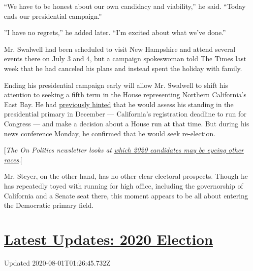 ``We have to be honest about our own candidacy and viability,'' he said.
``Today ends our presidential campaign.''

''I have no regrets,'' he added later. ``I'm excited about what we've
done.''

Mr. Swalwell had been scheduled to visit New Hampshire and attend
several events there on July 3 and 4, but a campaign spokeswoman told
The Times last week that he had canceled his plans and instead spent the
holiday with family.

Ending his presidential campaign early will allow Mr. Swalwell to shift
his attention to seeking a fifth term in the House representing Northern
California's East Bay. He had
\href{https://www.sfchronicle.com/politics/article/Eric-Swalwell-Running-for-president-if-I-m-14017678.php}{previously
hinted} that he would assess his standing in the presidential primary in
December --- California's registration deadline to run for Congress ---
and make a decision about a House run at that time. But during his news
conference Monday, he confirmed that he would seek re-election.

{[}\emph{The On Politics newsletter looks at}
\href{https://www.nytimes.com/2019/07/08/us/politics/on-politics-eric-swalwell.html}{\emph{which
2020 candidates may be eyeing other races}}\emph{.}{]}

Mr. Steyer, on the other hand, has no other clear electoral prospects.
Though he has repeatedly toyed with running for high office, including
the governorship of California and a Senate seat there, this moment
appears to be all about entering the Democratic primary field.

\hypertarget{latest-updates-2020-election}{%
\section{\texorpdfstring{\href{https://www.nytimes.com/2020/07/31/us/elections/biden-vs-trump.html?action=click\&pgtype=Article\&state=default\&region=MAIN_CONTENT_1\&context=storylines_live_updates}{Latest
Updates: 2020
Election}}{Latest Updates: 2020 Election}}\label{latest-updates-2020-election}}

Updated 2020-08-01T01:26:45.732Z

